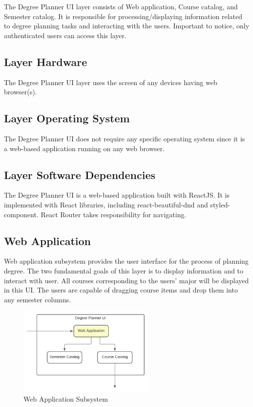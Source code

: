 The Degree Planner UI layer consists of Web application, Course catalog, and Semester catalog. It is responsible for processing/displaying information related to degree planning tasks and interacting with the users. Important to notice, only authenticated users can access this layer.

\subsection{Layer Hardware}
The Degree Planner UI layer uses the screen of any devices having web browser(s).

\subsection{Layer Operating System}
The Degree Planner UI does not require any specific operating system since it is a web-based application running on any web browser.

\subsection{Layer Software Dependencies}
The Degree Planner UI is a web-based application built with ReactJS. It is implemented with React libraries, including react-beautiful-dnd and styled-component. React Router takes responsibility for navigating.

\subsection{Web Application}
Web application subsystem provides the user interface for the process of planning degree. The two fundamental goals of this layer is to display information and to interact with user. All courses corresponding to the users' major will be displayed in this UI. The users are capable of dragging course items and drop them into any semester columns.

\begin{figure}[h!]
	\centering
 	\includegraphics[width=0.60\textwidth]{images/WebApplication} %
 \caption{Web Application Subsystem} %
\end{figure}

